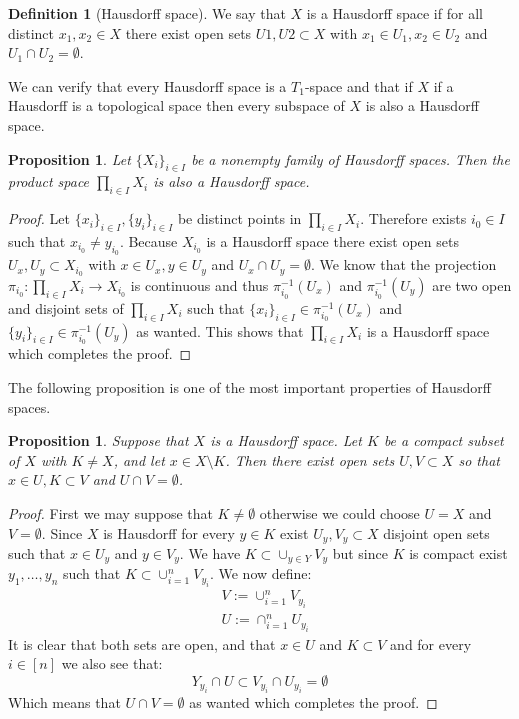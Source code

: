\documentclass[11pt,a4paper]{article}
\theoremstyle{definition}
\newtheorem{definition}{Definition}[section]
\theoremstyle{plain}
\newtheorem{proposition}[theorem]{Proposition}
\begin{document}
  \begin{definition}[Hausdorff space]
    We say that $X$ is a Hausdorff space if for all distinct 
    $x_1, x_2 \in X$ there exist open sets $U1, U2 \subset X$ with 
    $x_1 \in U_1, x_2 \in U_2$ and $U_1 \cap U_2 = \emptyset$.
  \end{definition}
  
  We can verify that every Hausdorff space is a $T_1$-space and that if
  $X$ if a Hausdorff is a topological space then every subspace of $X$
  is also a Hausdorff space.
  
  \begin{proposition}
    Let $\{X_i\}_{i \in I}$ be a nonempty family of Hausdorff spaces. 
    Then the product space $\prod_{i \in I}{X_i}$ is also a Hausdorff 
    space.
  \end{proposition}
  \begin{proof}
    Let $\{x_i\}_{i \in I}, \{y_i\}_{i \in I}$ be distinct points
    in $\prod_{i \in I}{X_i}$. Therefore exists $i_0 \in I$ such that
    $x_{i_0} \neq y_{i_0}$. Because $X_{i_0}$ is a Hausdorff space 
    there exist open sets $U_x, U_y \subset X_{i_0}$ with 
    $x \in U_x, y \in U_y$ and $U_x \cap U_y = \emptyset$. We know that
    the projection $\pi_{i_0} \colon \prod_{i \in I}{X_i} \to X_{i_0}$
    is continuous and thus $\pi_{i_0}^{-1}(U_x)$ and $\pi_{i_0}^{-1}(U_y)$
    are two open and disjoint sets of $\prod_{i \in I}{X_i}$ such
    that $\{x_i\}_{i \in I} \in \pi_{i_0}^{-1}(U_x)$ and 
    $\{y_i\}_{i \in I} \in \pi_{i_0}^{-1}(U_y)$ as wanted. This shows
    that $\prod_{i \in I}{X_i}$ is a Hausdorff space which completes
    the proof.
  \end{proof}
  
  The following proposition is one of the most important properties of
  Hausdorff spaces.
  
  \begin{proposition}
    Suppose that $X$ is a Hausdorff space. Let $K$ be a compact subset
    of $X$ with $K \neq X$, and let $x \in X \setminus K$. Then there 	
    exist open sets $U, V \subset X$ so that $x \in U , K \subset V$ 
    and $U \cap V = \emptyset$.
  \end{proposition}
  \begin{proof}
    First we may suppose that $K \neq \emptyset$ otherwise we could
    choose $U = X$ and $V = \emptyset$. Since $X$ is Hausdorff for
    every $y \in K$ exist $U_y, V_y \subset X$ disjoint open sets 
    such that $x \in U_y$ and $y \in V_y$. We have 
    $K \subset \cup_{y \in Y}{V_y}$ but since $K$ is compact exist
    $y_1,\dots,y_n$ such that $K \subset \cup_{i=1}^{n}{V_{y_i}}$.
    We now define:
    \begin{align*}
      &V := \cup_{i=1}^{n}{V_{y_i}} \\
      &U := \cap_{i=1}^{n}{U_{y_i}}
    \end{align*}
    It is clear that both sets are open, and that $x \in U$ and
    $K \subset V$ and for every $i \in [n]$ we also see that:
    \[
      Y_{y_i} \cap U \subset V_{y_i} \cap U_{y_i} = \emptyset
    \]
    Which means that $U \cap V = \emptyset$ as wanted which completes
    the proof.
  \end{proof}
  
\end{document}
